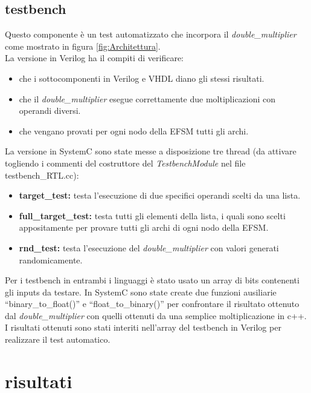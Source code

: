 \documentclass[]{IEEEtran}
\begin{document}
\subsection{testbench}
Questo componente è un test automatizzato che incorpora il \textit{double\_multiplier} come mostrato in figura \ref{fig:Architettura}.
\\La versione in Verilog ha il compiti di verificare:
\begin{itemize}
    \item che i sottocomponenti in Verilog e VHDL diano gli stessi risultati.
    \item che il \textit{double\_multiplier} esegue correttamente due moltiplicazioni con operandi diversi.
    \item che vengano provati per ogni nodo della EFSM tutti gli archi.
\end{itemize}
La versione in SystemC sono state messe a disposizione tre thread (da attivare togliendo i commenti del costruttore del \textit{TestbenchModule} nel file testbench\_RTL.cc):
\begin{itemize}
    \item \textbf{target\_test:} testa l'esecuzione di due specifici operandi scelti da una lista.
    \item \textbf{full\_target\_test:} testa tutti gli elementi della lista, i quali sono scelti appositamente per provare tutti gli archi di ogni nodo della EFSM.
    \item \textbf{rnd\_test:} testa l'esecuzione del \textit{double\_multiplier} con valori generati randomicamente.
\end{itemize}
Per i testbench in entrambi i linguaggi è stato usato un array di bits contenenti gli inputs da testare. In SystemC sono state create due funzioni ausiliarie ``binary\_to\_float()'' e ``float\_to\_binary()'' per confrontare il risultato ottenuto dal \textit{double\_multiplier} con quelli ottenuti da una semplice moltiplicazione in c++. I risultati ottenuti sono stati interiti nell'array del testbench in Verilog per realizzare il test automatico.



\section{risultati}
\end{document}
